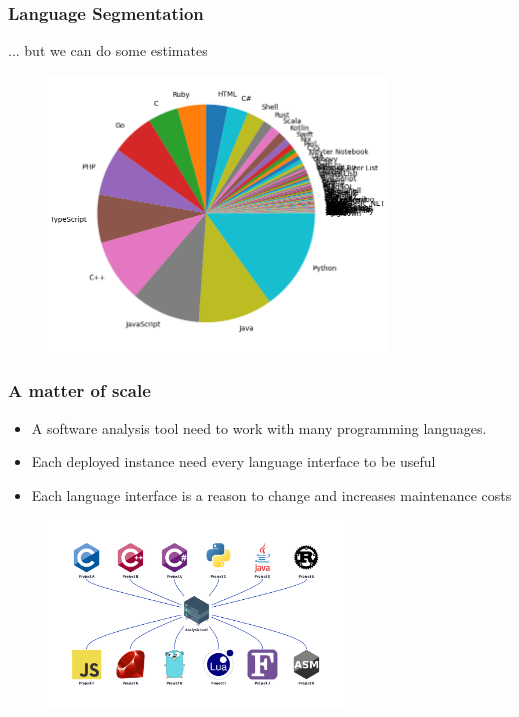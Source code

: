 \documentclass[dvipsnames, 10pt]{beamer}
\begin{document}
\begin{frame}
  \frametitle{Language Segmentation}
  ... but we can do some estimates
  \begin{figure}
    \begin{center}
      \includegraphics[width=0.8\textwidth]{figures/githut/statistics.png}
    \end{center}
  \end{figure}
\end{frame}

\begin{frame}
  \frametitle{A matter of scale}
  \begin{itemize}
    \item A software analysis tool need to work with many programming languages.
    \item Each deployed instance need every language interface to be useful
    \item Each language interface is a reason to change and increases maintenance costs
  \end{itemize}
  \begin{figure}
    \begin{center}
      \includegraphics[width=0.7\textwidth]{figures/githut/problem-many-languages.png}
    \end{center}
  \end{figure}
\end{frame}
\end{document}
